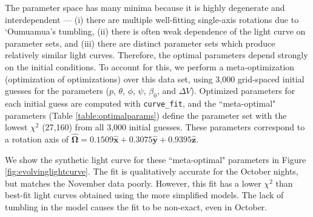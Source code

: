 \documentclass[twocolumn,doublespacing]{aastex631}
\begin{document}
The parameter space has many minima because it is highly degenerate and interdependent --- (i) there are multiple well-fitting single-axis rotations due to `Oumuamua's tumbling, (ii) there is often weak dependence of the light curve on parameter sets, and (iii) there are distinct parameter sets which produce relatively similar light curves. Therefore, the optimal parameters depend strongly on the initial conditions. To account for this, we perform a meta-optimization (optimization of optimizations) over this data set, using 3,000 grid-spaced initial guesses for the parameters ($p$, $\theta$, $\phi$, $\psi$, $\beta_0$, and $\Delta V$). Optimized parameters for each initial guess are computed with \texttt{curve\_fit}, and the ``meta-optimal" parameters (Table \ref{table:optimalparams}) define the parameter set with the lowest $\chi^2$ (27,160) from all 3,000 initial guesses. These parameters correspond to a rotation axis of $\boldsymbol{\hat{\Omega}} =0.1509\boldsymbol{\hat{x}}+0.3075\boldsymbol{\hat{y}}+0.9395\boldsymbol{\hat{z}}$.

We show the synthetic light curve for these ``meta-optimal" parameters in Figure \ref{fig:evolvinglightcurve}. The fit is qualitatively accurate for the October nights, but matches the November data poorly. However, this fit has a lower $\chi^2$ than best-fit light curves obtained using the more simplified models. The lack of tumbling in the model causes the fit to be non-exact, even in October. 
\end{document}
